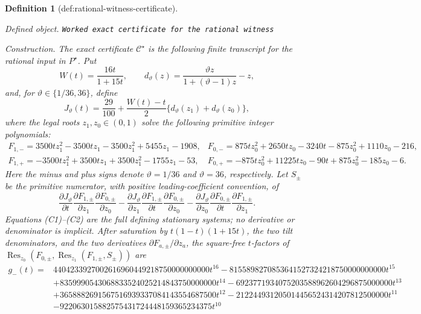 \documentclass{article}
\newtheorem{definition}{Definition}
\begin{document}
\begin{definition}[def:rational-witness-certificate]\label{def:rational-witness-certificate}
\par\smallskip\noindent\emph{Defined object.} \texttt{Worked exact certificate for the rational witness}
\par\smallskip\noindent\emph{Construction.} The exact certificate \(\mathcal C^\star\) is the following finite transcript for the rational input in \(P^\star\).  Put
\[
W(t)=\frac{16t}{1+15t},\qquad
d_\vartheta(z)=\frac{\vartheta z}{1+(\vartheta-1)z}-z,
\]
and, for \(\vartheta\in\{1/36,36\}\), define
\[
J_\vartheta(t)=\frac{29}{100}
+\frac{W(t)-t}{2}\{d_\vartheta(z_1)+d_\vartheta(z_0)\},
\]
where the legal roots \(z_1,z_0\in(0,1)\) solve the following primitive integer polynomials:
\[
\begin{array}{ll}
F_{1,-}=3500tz_1^2-3500tz_1-3500z_1^2+5455z_1-1908,
&F_{0,-}=875tz_0^2+2650tz_0-3240t-875z_0^2+1110z_0-216,\\
F_{1,+}=-3500tz_1^2+3500tz_1+3500z_1^2-1755z_1-53,
&F_{0,+}=-875tz_0^2+11225tz_0-90t+875z_0^2-185z_0-6.
\end{array}
\tag{C1}
\]
Here the minus and plus signs denote \(\vartheta=1/36\) and \(\vartheta=36\), respectively.  Let \(S_\pm\) be the primitive numerator, with positive leading-coefficient convention, of
\[
\frac{\partial J_\vartheta}{\partial t}
\frac{\partial F_{1,\pm}}{\partial z_1}
\frac{\partial F_{0,\pm}}{\partial z_0}
-\frac{\partial J_\vartheta}{\partial z_1}
\frac{\partial F_{1,\pm}}{\partial t}
\frac{\partial F_{0,\pm}}{\partial z_0}
-\frac{\partial J_\vartheta}{\partial z_0}
\frac{\partial F_{0,\pm}}{\partial t}
\frac{\partial F_{1,\pm}}{\partial z_1}.
\tag{C2}
\]
Equations (C1)--(C2) are the full defining stationary systems; no derivative or denominator is implicit.  After saturation by \(t(1-t)(1+15t)\), the two tilt denominators, and the two derivatives \(\partial F_{a,\pm}/\partial z_a\), the square-free \(t\)-factors of
\(\operatorname{Res}_{z_0}(F_{0,\pm},\operatorname{Res}_{z_1}(F_{1,\pm},S_\pm))\)
are
\[
\begin{aligned}
g_-(t)={}&4404233927002616960449218750000000000t^{16}
-8155898270853641527324218750000000000t^{15}\\
&+8359990543068833524025214843750000000t^{14}
-6923771934075203588962604296875000000t^{13}\\
&+3658882691567516939337084143554687500t^{12}
-212244931205014456524314207812500000t^{11}\\
&-922063015882575431724448159365234375t^{10}

\end{aligned}\]
\end{definition}
\end{document}
